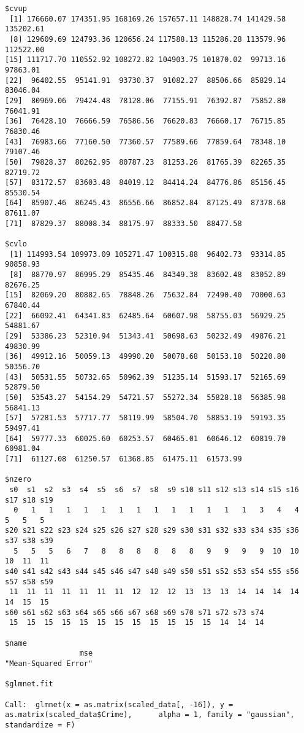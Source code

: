 \documentclass[11pt]{article}
\begin{document}
\begin{verbatim}
$cvup
 [1] 176660.07 174351.95 168169.26 157657.11 148828.74 141429.58 135202.61
 [8] 129609.69 124793.36 120656.24 117588.13 115286.28 113579.96 112522.00
[15] 111717.70 110552.92 108272.82 104903.75 101870.02  99713.16  97863.01
[22]  96402.55  95141.91  93730.37  91082.27  88506.66  85829.14  83046.04
[29]  80969.06  79424.48  78128.06  77155.91  76392.87  75852.80  76041.91
[36]  76428.10  76666.59  76586.56  76620.83  76660.17  76715.85  76830.46
[43]  76983.66  77160.50  77360.57  77589.66  77859.64  78348.10  79107.46
[50]  79828.37  80262.95  80787.23  81253.26  81765.39  82265.35  82719.72
[57]  83172.57  83603.48  84019.12  84414.24  84776.86  85156.45  85530.54
[64]  85907.46  86245.43  86556.66  86852.84  87125.49  87378.68  87611.07
[71]  87829.37  88008.34  88175.97  88333.50  88477.58

$cvlo
 [1] 114993.54 109973.09 105271.47 100315.88  96402.73  93314.85  90858.93
 [8]  88770.97  86995.29  85435.46  84349.38  83602.48  83052.89  82676.25
[15]  82069.20  80882.65  78848.26  75632.84  72490.40  70000.63  67840.44
[22]  66092.41  64341.83  62485.64  60607.98  58755.03  56929.25  54881.67
[29]  53386.23  52310.94  51343.41  50698.63  50232.49  49876.21  49830.99
[36]  49912.16  50059.13  49990.20  50078.68  50153.18  50220.80  50356.70
[43]  50531.55  50732.65  50962.39  51235.14  51593.17  52165.69  52879.50
[50]  53543.27  54154.29  54721.57  55272.34  55828.18  56385.98  56841.13
[57]  57281.53  57717.77  58119.99  58504.70  58853.19  59193.35  59497.41
[64]  59777.33  60025.60  60253.57  60465.01  60646.12  60819.70  60981.04
[71]  61127.08  61250.57  61368.85  61475.11  61573.99

$nzero
 s0  s1  s2  s3  s4  s5  s6  s7  s8  s9 s10 s11 s12 s13 s14 s15 s16 s17 s18 s19 
  0   1   1   1   1   1   1   1   1   1   1   1   1   1   3   4   4   5   5   5 
s20 s21 s22 s23 s24 s25 s26 s27 s28 s29 s30 s31 s32 s33 s34 s35 s36 s37 s38 s39 
  5   5   5   6   7   8   8   8   8   8   8   9   9   9   9  10  10  10  11  11 
s40 s41 s42 s43 s44 s45 s46 s47 s48 s49 s50 s51 s52 s53 s54 s55 s56 s57 s58 s59 
 11  11  11  11  11  11  11  12  12  12  13  13  13  14  14  14  14  14  15  15 
s60 s61 s62 s63 s64 s65 s66 s67 s68 s69 s70 s71 s72 s73 s74 
 15  15  15  15  15  15  15  15  15  15  15  15  14  14  14 

$name
                 mse 
"Mean-Squared Error" 

$glmnet.fit

Call:  glmnet(x = as.matrix(scaled_data[, -16]), y = as.matrix(scaled_data$Crime),      alpha = 1, family = "gaussian", standardize = F) 


\end{verbatim}
\end{document}
